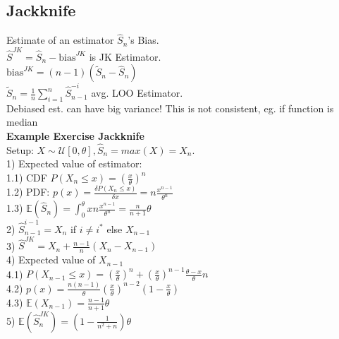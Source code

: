 \subsection*{Jackknife}
Estimate of an estimator $\hat{S}_n$'s Bias.\\
$\hat{S}^{JK}=\hat{S}_n-\mathrm{bias}^{JK}$ is JK Estimator.\\
$\mathrm{bias}^{JK}{=}(n{-}1)(\tilde{S}_n{-}\hat{S}_n)$\\
$\tilde{S}_n{=}\frac{1}{n}\sum_{i=1}^n\hat{S}_{n{-}1}^{-i}$ avg. LOO Estimator. \\
Debiased est. can have big variance! This is not consistent, eg. if function is median\\
\textbf{Example Exercise Jackknife} \\
Setup: $X \sim \mathcal{U}[0, \theta], \hat S_n = max(X) = X_n$. \\
1) Expected value of estimator: \\
1.1) CDF $P(X_n \leq x) = (\frac{x}{\theta})^n$ \\
1.2) PDF: $p(x) = \frac{\delta P(X_n \leq x)}{\delta x} = n \frac{x^{n-1}}{\theta^n}$ \\
1.3) $\mathbb{E}(\hat S_n) = \int_0^\theta x n \frac{x^{n-1}}{\theta^n} = \frac{n}{n+1}\theta$ \\
2) $\hat S_{n-1}^{i-1} = X_n$ if $i \neq i^*$ else $X_{n-1}$\\
3) $\hat S^{JK} = X_n+\frac{n-1}{n}(X_n - X_{n-1})$ \\
4) Expected value of $X_{n-1}$ \\
4.1) $P(X_{n-1} \leq x) = (\frac{x}{\theta})^n + (\frac{x}{\theta})^{n-1}\frac{\theta-x}{\theta}n$ \\
4.2) $p(x) = \frac{n(n-1)}{\theta}(\frac{x}{\theta})^{n-2}(1-\frac{x}{\theta})$\\
4.3) $\mathbb{E}(X_{n-1})= \frac{n-1}{n+1}\theta$ \\
5) $\mathbb{E}(\hat S_n^{JK}) = (1-\frac{1}{n^2+n})\theta$

%
